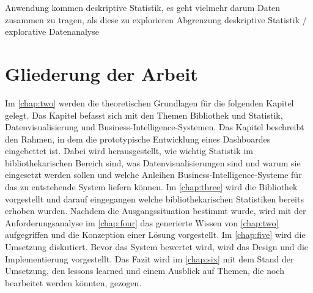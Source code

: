 Anwendung kommen deskriptive Statistik, es geht vielmehr darum Daten zusammen zu tragen, als diese zu explorieren 
Abgrenzung deskriptive Statistik / explorative Datenanalyse

\section{Gliederung der Arbeit}
Im \autoref{chap:two} werden die theoretischen Grundlagen für die folgenden Kapitel gelegt. Das Kapitel befasst
sich mit den Themen Bibliothek und Statistik, Datenvisualisierung und Business-Intelligence-Systemen. Das Kapitel beschreibt
den Rahmen, in dem die prototypische Entwicklung eines Dashboardes eingebettet ist. Dabei wird herausgestellt, wie wichtig Statistik
im bibliothekarischen Bereich sind, was Datenvisualisierungen sind und warum sie eingesetzt werden sollen und welche Anleihen Business-Intelligence-Systeme 
für das zu entstehende System liefern können. Im \autoref{chap:three}
wird die Bibliothek vorgestellt und darauf eingegangen welche bibliothekarischen Statistiken bereits erhoben wurden.
Nachdem die Ausgangssituation bestimmt wurde, wird mit der Anforderungsanalyse  im \autoref{chap:four} das generierte Wissen von \autoref{chap:two}
aufgegriffen und die Konzeption einer Lösung vorgestellt.
Im \autoref{chap:five} wird die Umsetzung diskutiert. Bevor das System bewertet wird, wird das Design und die Implementierung vorgestellt.
Das Fazit wird im \autoref{chap:six} mit dem Stand der Umsetzung, den lessons learned und einem Ausblick auf Themen, die noch bearbeitet werden könnten, gezogen.
